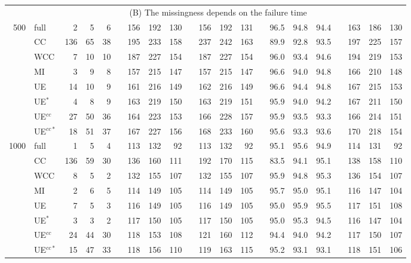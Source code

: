 \documentclass[
  12pt,
  openany, oneside]{book}
\theoremstyle{definition}
\theoremstyle{definition}
\theoremstyle{definition}
\theoremstyle{definition}
\theoremstyle{remark}
\begin{document}
\begin{table}
\begin{tabular}{rlrrrrrrrrrrrrrrrrrrr}
\noalign{\smallskip}
& \multicolumn{20}{c}{(B) The missingness depends on the failure time}\\
\noalign{\smallskip}
500 
& full      & 2  &    5 &      6 &&     156  & 192 &  130 &&  156  &  192  &  131  &&  96.5 &  94.8 &  94.4 &&  163 &  186 &  130 \\
& CC       & 136 &  65 &   38 &&    195 &  233 &  158 &&  237  &  242  &  163  &&  89.9 &  92.8  & 93.5 &&  197 &  225  & 157 \\
& WCC    & 7   &  10 &   10  &&   187 &  227 &  154  && 187  &  227  &  154   && 96.0 &   93.4 &  94.6 &&  194 &  219 &  153 \\
& MI       & 3    & 9 &     8  &&   157  & 215   &  147  && 157  &  215  &  147   && 96.6  & 94.0  &   94.8 &&  166 &  210  & 148 \\
& UE       & 14  &  10 &   9   &&   161 &  216 &  149  &&  162 &   216  &  149   && 96.6  & 94.4  & 94.8  && 167 &  215  & 153 \\
& UE$^*$ & 4    & 8 &     9  &&   163  & 219  &  150  &&  163  &  219  &  151   && 95.9  & 94.0  &   94.2 &&  167 &  211 &  150 \\
& UE$^{cc}$ & 27  &  50 &   36 &&    164  & 223 &  153 &&  166  &  228  &  157   && 95.9  & 93.5 &  93.3  && 166 &  214  & 151 \\
& UE$^{cc*}$ & 18  &  51 &    37 &&    167 &  227 &  156 && 168 &   233  &  160   && 95.6  & 93.3 &  93.6 &&  170 &  218  & 154 \\
\noalign{\smallskip}
1000
& full       & 1 &     5  &   4   &&   113 &  132 &  92   && 113  &  132  &  92   &&  95.1  & 95.6  & 94.9  && 114  & 131 &  92  \\
& CC       & 136 &   59 &   30 &&   136 &  160  & 111  && 192  &  170 &   115 &&   83.5  & 94.1 &  95.1  && 138 &  158 &  110 \\
& WCC     & 8 &      5   &  2   &&  132 &  155  & 107  && 132  &  155  &  107  &&  95.9  & 94.8  & 95.3  && 136  & 154  & 107 \\
& MI        & 2 &      6   &  5   &&  114  & 149  & 105  && 114  &  149  &  105  &&  95.7  & 95.0  &   95.1 && 116  & 147  & 104 \\
& UE       & 7 &      5   &  3  &&   116  & 149  & 105  && 116  &  149  &  105  &&  95.0 &   95.9  & 95.5  && 117 &  151  & 108  \\ 
& UE$^*$  & 3 &      3   &  2  &&   117  & 150  & 105  && 117  &  150  &  105  &&  95.0 &   95.3 &  94.5  && 116 &  147  & 104 \\
& UE$^{cc}$ & 24 &    44  & 30  &&   118 &  153 &  108 &&  121 &   160 &   112 &&   94.4 &  94.0   &  94.2  && 117  & 150  & 107 \\
& UE$^{cc*}$ & 15 &    47 & 33   &&  118  & 156  & 110  && 119 &   163 &   115  &&  95.2  & 93.1  & 93.1  && 118  & 151  & 106 \\


\end{tabular}
\end{table}
\end{document}
